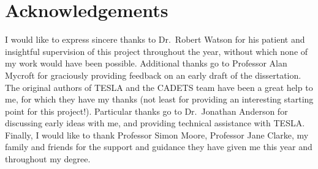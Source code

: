 \section*{Acknowledgements}

I would like to express sincere thanks to Dr.\ Robert Watson for his patient and
insightful supervision of this project throughout the year, without which none
of my work would have been possible. Additional thanks go to Professor Alan
Mycroft for graciously providing feedback on an early draft of the dissertation.
The original authors of TESLA and the CADETS team have been a great help to me,
for which they have my thanks (not least for providing an interesting starting
point for this project!). Particular thanks go to Dr.\ Jonathan Anderson for
discussing early ideas with me, and providing technical assistance with TESLA.
Finally, I would like to thank Professor Simon Moore, Professor Jane Clarke, my
family and friends for the support and guidance they have given me this year and
throughout my degree.
